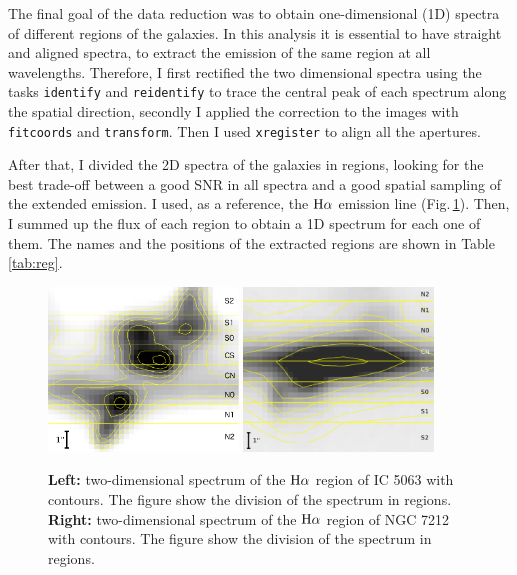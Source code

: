 \documentclass[../main.tex]{subfiles}
\begin{document}
The final goal of the data reduction was to obtain one-dimensional (1D) spectra of different regions of the galaxies.
In this analysis it is essential to have straight and aligned spectra, to extract the emission of the same region at all wavelengths. 
Therefore, I first rectified the two dimensional spectra using the tasks \verb!identify! and \verb!reidentify! to trace the central peak of each spectrum along the spatial direction, secondly I applied the correction to the images with \verb!fitcoords! and \verb!transform!. 
Then I used \verb!xregister! to align all the apertures.

After that, I divided the 2D spectra of the galaxies in regions, looking for the best trade-off between a good SNR in all spectra and a good spatial sampling of the extended emission.
I used, as a reference, the $\rm H\alpha$ emission line (Fig.\,\ref{fig:sub_regions}).
Then, I summed up the flux of each region to obtain a 1D spectrum for each one of them.
The names and the positions of the extracted regions are shown in Table\,\ref{tab:reg}.

\begin{figure}
\centering
\includegraphics[width=0.45\textwidth]{images/paper1/IC5063_reg.jpg} 
\quad\quad
\includegraphics[width=0.45\textwidth]{images/paper1/NGC7212_reg.pdf}
\caption[]{\textbf{Left:} two-dimensional spectrum of the $\rm H\alpha$ region of IC 5063 with contours. The figure show the division of the spectrum in regions.
\textbf{Right:} two-dimensional spectrum of the $\rm H\alpha$ region of NGC 7212 with contours. The figure show the division of the spectrum in regions.}
\label{fig:sub_regions}
\end{figure}
\end{document}
